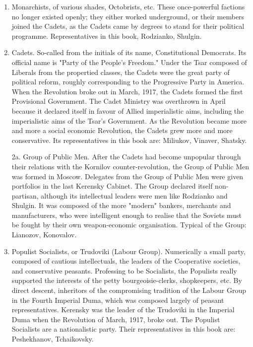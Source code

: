 \begin{enumerate}
\item Monarchists, of various shades, Octobrists, etc. These once-powerful factions no longer existed openly; they either worked underground, or their members joined the Cadets, as the Cadets came by degrees to stand for their political programme. Representatives in this book, Rodzianko, Shulgin.

\item Cadets. So-called from the initials of its name, Constitutional Democrats. Its official name is "Party of the People's Freedom." Under the Tsar composed of Liberals from the propertied classes, the Cadets were the great party of political reform, roughly corresponding to the Progressive Party in America. When the Revolution broke out in March, 1917, the Cadets formed the first Provisional Government. The Cadet Ministry was overthrown in April because it declared itself in favour of Allied imperialistic aims, including the imperialistic aims of the Tsar's Government. As the Revolution became more and more a social economic Revolution, the Cadets grew more and more conservative. Its representatives in this book are: Miliukov, Vinaver, Shatsky.

2a. Group of Public Men. After the Cadets had become unpopular through their relations with the Kornilov counter-revolution, the Group of Public Men was formed in Moscow. Delegates from the Group of Public Men were given portfolios in the last Kerensky Cabinet. The Group declared itself non-partisan, although its intellectual leaders were men like Rodzianko and Shulgin. It was composed of the more "modern" bankers, merchants and manufacturers, who were intelligent enough to realise that the Soviets must be fought by their own weapon-economic organisation. Typical of the Group: Lianozov, Konovalov.

\item Populist Socialists, or Trudoviki (Labour Group). Numerically a small party, composed of cautious intellectuals, the leaders of the Cooperative societies, and conservative peasants. Professing to be Socialists, the Populists really supported the interests of the petty bourgeoisie-clerks, shopkeepers, etc. By direct descent, inheritors of the compromising tradition of the Labour Group in the Fourth Imperial Duma, which was composed largely of peasant representatives. Kerensky was the leader of the Trudoviki in the Imperial Duma when the Revolution of March, 1917, broke out. The Populist Socialists are a nationalistic party. Their representatives in this book are: Peshekhanov, Tchaikovsky.


\end{enumerate}

